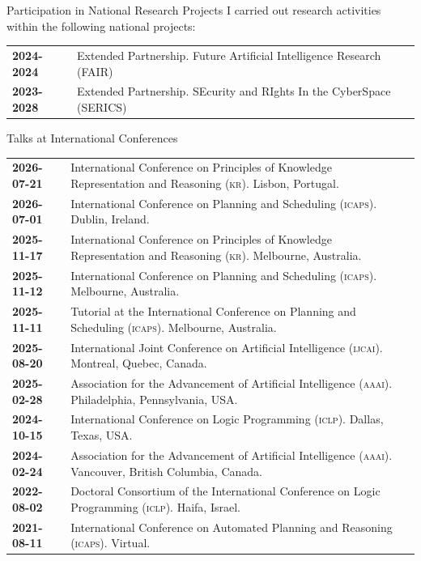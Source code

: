 \documentclass{resume} %
\begin{document}
\begin{rSection}{Participation in National Research Projects}
I carried out research activities within the following national projects:\\
	\begin{tabularx}{0.95\textwidth} {lp{14cm}}
  \textbf{2024-2024} & Extended Partnership. Future Artificial Intelligence Research (FAIR)\\
 \textbf{2023-2028} & Extended Partnership. SEcurity and RIghts In the CyberSpace (SERICS)\\
 \end{tabularx}
\end{rSection}

\begin{rSection}{Talks at International Conferences}
	\begin{tabularx}{0.95\textwidth} {lp{14cm}}
 \textbf{2026-07-21} & International Conference on Principles of Knowledge Representation and Reasoning (\textsc{kr}). Lisbon, Portugal.\\
 \textbf{2026-07-01} & International Conference on Planning and Scheduling (\textsc{icaps}). Dublin, Ireland.\\
 \textbf{2025-11-17} & International Conference on Principles of Knowledge Representation and Reasoning (\textsc{kr}). Melbourne, Australia.\\
 \textbf{2025-11-12} & International Conference on Planning and Scheduling (\textsc{icaps}). Melbourne, Australia.\\
 \textbf{2025-11-11} & Tutorial at the International Conference on Planning and Scheduling (\textsc{icaps}). Melbourne, Australia.\\
 \textbf{2025-08-20} & International Joint Conference on Artificial Intelligence (\textsc{ijcai}). Montreal, Quebec, Canada.\\
 \textbf{2025-02-28} & Association for the Advancement of Artificial Intelligence (\textsc{aaai}). Philadelphia, Pennsylvania, USA.\\
 \textbf{2024-10-15} & International Conference on Logic Programming (\textsc{iclp}). Dallas, Texas, USA.\\
 \textbf{2024-02-24} & Association for the Advancement of Artificial Intelligence (\textsc{aaai}). Vancouver, British Columbia, Canada.\\
 \textbf{2022-08-02} & Doctoral Consortium of the International Conference on Logic Programming (\textsc{iclp}). Haifa, Israel.\\
 \textbf{2021-08-11} & International Conference on Automated Planning and Reasoning (\textsc{icaps}). Virtual.\\
 \end{tabularx}
 \end{rSection}
 
\end{document}
